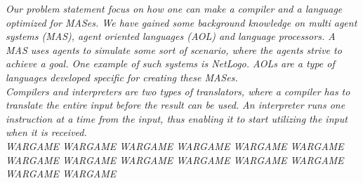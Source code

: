 \textit{Our problem statement focus on how one can make a compiler and a language optimized for MASes. We have gained some background knowledge on multi agent systems (MAS), agent oriented languages (AOL) and language processors. A MAS uses agents to simulate some sort of scenario, where the agents strive to achieve a goal. One example of such systems is NetLogo\cite{misc:netlogo}. AOLs are a type of languages developed specific for creating these MASes.\\ \indent
Compilers and interpreters are two types of translators, where a compiler has to translate the entire input before the result
can be used. An interpreter runs one instruction at a time from the input, thus enabling it to start utilizing the input when it is received.\\ \indent
WARGAME WARGAME WARGAME WARGAME WARGAME WARGAME WARGAME WARGAME WARGAME WARGAME WARGAME WARGAME WARGAME WARGAME}
